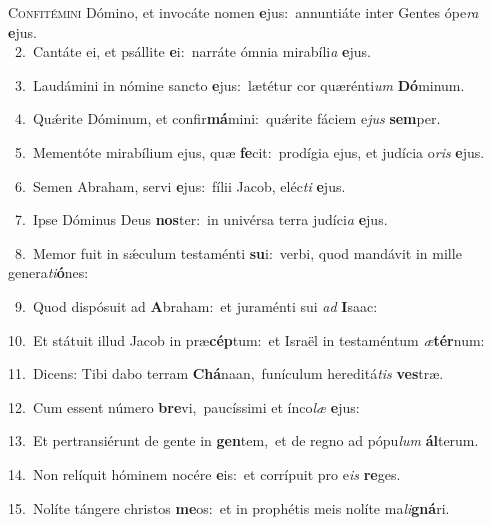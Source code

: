 \lettrine{\initial\textcolor{\initialcolor}{C}}{onfitémini} Dómino, et invocáte nomen \textbf{e}\-jus:~\star annuntiáte inter Gentes ópe\textit{ra} \textbf{e}\-jus.\\
{\numbfont\textcolor{\numbcolor}{~2.}}~Cantáte ei, et psállite \textbf{e}\-i:~\star narráte ómnia mirabíli\textit{a} \textbf{e}\-jus.\par
{\numbfont\textcolor{\numbcolor}{~3.}}~Laudámini in nómine sancto \textbf{e}\-jus:~\star lætétur cor quærénti\textit{um} \textbf{Dó}\-minum.\par
{\numbfont\textcolor{\numbcolor}{~4.}}~Quǽrite Dóminum, et confir\-\textbf{má}\-mini:~\star quǽrite fáciem e\textit{jus} \textbf{sem}\-per.\par
{\numbfont\textcolor{\numbcolor}{~5.}}~Mementóte mirabílium ejus, quæ \textbf{fe}\-cit:~\star prodígia ejus, et judícia o\textit{ris} \textbf{e}\-jus.\par
{\numbfont\textcolor{\numbcolor}{~6.}}~Semen Abraham, servi \textbf{e}\-jus:~\star fílii Jacob, eléc\textit{ti} \textbf{e}\-jus.\par
{\numbfont\textcolor{\numbcolor}{~7.}}~Ipse Dóminus Deus \textbf{nos}\-ter:~\star in univérsa terra judíci\textit{a} \textbf{e}\-jus.\par
{\numbfont\textcolor{\numbcolor}{~8.}}~Memor fuit in sǽculum testaménti \textbf{su}\-i:~\star verbi, quod mandávit in mille genera\-\textit{ti}\-\textbf{ó}nes:\par
{\numbfont\textcolor{\numbcolor}{~9.}}~Quod dispósuit ad \textbf{A}\-braham:~\star et juraménti sui \textit{ad} \textbf{I}\-saac:\par
{\numbfont\textcolor{\numbcolor}{10.}}~Et státuit illud Jacob in præ\-\textbf{cép}\-tum:~\star et Israël in testaméntum \textit{æ}\-\textbf{tér}num:\par
{\numbfont\textcolor{\numbcolor}{11.}}~Dicens: Tibi dabo terram \textbf{Chá}\-naan,~\star funículum hereditá\textit{tis} \textbf{ves}\-træ.\par
{\numbfont\textcolor{\numbcolor}{12.}}~Cum essent número \textbf{bre}\-vi,~\star paucíssimi et ínco\textit{læ} \textbf{e}\-jus:\par
{\numbfont\textcolor{\numbcolor}{13.}}~Et pertransiérunt de gente in \textbf{gen}\-tem,~\star et de regno ad pópu\textit{lum} \textbf{ál}\-terum.\par
{\numbfont\textcolor{\numbcolor}{14.}}~Non relíquit hóminem nocére \textbf{e}\-is:~\star et corrípuit pro e\textit{is} \textbf{re}\-ges.\par
{\numbfont\textcolor{\numbcolor}{15.}}~Nolíte tángere christos \textbf{me}\-os:~\star et in prophétis meis nolíte ma\-\textit{li}\-\textbf{gná}ri.\par
